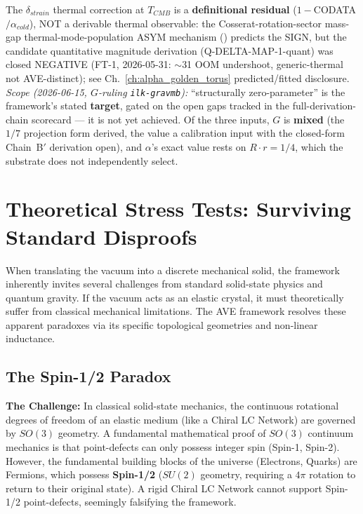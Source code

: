 The $\delta_{strain}$ thermal correction at $T_{CMB}$ is a \textbf{definitional residual} ($1-$CODATA$/\alpha_{cold}$), NOT a derivable thermal observable: the Cosserat-rotation-sector mass-gap thermal-mode-population ASYM mechanism () predicts the SIGN, but the candidate quantitative magnitude derivation (Q-DELTA-MAP-1-quant) was closed NEGATIVE (FT-1, 2026-05-31: $\sim$31 OOM undershoot, generic-thermal not AVE-distinct); see Ch.~\ref{ch:alpha_golden_torus} predicted/fitted disclosure. \emph{Scope (2026-06-15, $G$-ruling \texttt{ilk-gravmb}):} ``structurally zero-parameter'' is the framework's stated \textbf{target}, gated on the open gaps tracked in the full-derivation-chain scorecard --- it is not yet achieved. Of the three inputs, $G$ is \textbf{mixed} (the $1/7$ projection form derived, the value a calibration input with the closed-form Chain~B$'$ derivation open), and $\alpha$'s exact value rests on $R \cdot r = 1/4$, which the substrate does not independently select.

\chapter{Theoretical Stress Tests: Surviving Standard Disproofs}
\label{app:resolving_paradoxes}

When translating the vacuum into a discrete mechanical solid, the framework inherently invites several challenges from standard solid-state physics and quantum gravity. If the vacuum acts as an elastic crystal, it must theoretically suffer from classical mechanical limitations. The AVE framework resolves these apparent paradoxes via its specific topological geometries and non-linear inductance.

\section{The Spin-1/2 Paradox}
\textbf{The Challenge:} In classical solid-state mechanics, the continuous rotational degrees of freedom of an elastic medium (like a Chiral LC Network) are governed by $SO(3)$ geometry. A fundamental mathematical proof of $SO(3)$ continuum mechanics is that point-defects can only possess integer spin (Spin-1, Spin-2). However, the fundamental building blocks of the universe (Electrons, Quarks) are Fermions, which possess \textbf{Spin-1/2} ($SU(2)$ geometry, requiring a $4\pi$ rotation to return to their original state). A rigid Chiral LC Network cannot support Spin-1/2 point-defects, seemingly falsifying the framework.

